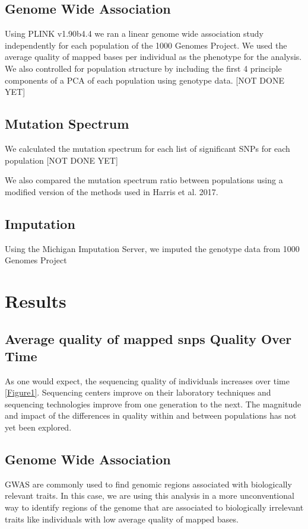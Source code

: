 \documentclass[12pt]{amsart}
\begin{document}
\subsection{Genome Wide Association}

Using PLINK v1.90b4.4 we ran a linear genome wide association study independently for each population of the 1000 Genomes Project. We used the average quality of mapped bases per individual as the phenotype for the analysis. We also controlled for population structure by including the first 4 principle components of a PCA of each population using genotype data. [NOT DONE YET]

\subsection{Mutation Spectrum}
We calculated the mutation spectrum for each list of significant SNPs for each population [NOT DONE YET]

We also compared the mutation spectrum ratio between populations using a modified version of the methods used in Harris et al. 2017. 

\subsection{Imputation}
Using the Michigan Imputation Server, we imputed the genotype data from 1000 Genomes Project

			\section{Results}
\subsection{Average quality of mapped snps Quality Over Time}
As one would expect, the sequencing quality of individuals increases over time \ref{Figure1}. Sequencing centers improve on their laboratory techniques and sequencing technologies improve from one generation to the next. The magnitude and impact of the differences in quality within and between populations has not yet been explored. 

\subsection{Genome Wide Association}
GWAS are commonly used to find genomic regions associated with biologically relevant traits. In this case, we are using this analysis in a more unconventional way to identify regions of the genome that are associated to biologically irrelevant traits like individuals with low average quality of mapped bases.
 
\end{document}
